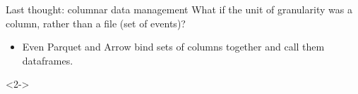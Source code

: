 \documentclass[aspectratio=169]{beamer}
\begin{document}
\begin{frame}{Last thought: columnar data management}
\vspace{0.5 cm}
What if the unit of granularity was a column, rather than a file (set of events)?
\begin{itemize}
\item Even Parquet and Arrow bind sets of columns together and call them dataframes.
\end{itemize}

\begin{uncoverenv}<2->
\begin{center}
\end{center}
\end{uncoverenv}
\end{frame}
\end{document}
